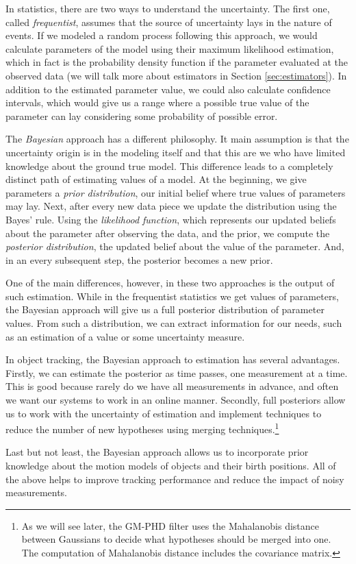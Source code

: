 
In statistics, there are two ways to understand the uncertainty. The first one,
called \textit{frequentist}, assumes that the source of uncertainty lays in the
nature of events. If we modeled a random process following this approach, we 
would calculate parameters of the model using their maximum likelihood 
estimation, which in fact is the probability density function if the parameter 
evaluated at the observed data (we will talk more about estimators in Section 
\ref{sec:estimators}). In addition to the estimated parameter 
value, we could also calculate confidence intervals, which would give us a 
range where a possible true value of the parameter can lay considering some 
probability of possible error.

The \textit{Bayesian} approach has a different philosophy. It main
assumption is that the uncertainty origin is in the modeling itself and that
this are we who have limited knowledge about the ground true model. This
difference leads to a completely distinct path of estimating values of a model.
At the beginning, we give parameters a \textit{prior distribution}, our
initial belief where true values of parameters may lay. Next, after every new
data piece we update the distribution using the Bayes' rule. Using the
\textit{likelihood function}, which represents our updated beliefs about the
parameter after observing the data, and the prior, we compute the
\textit{posterior distribution}, the updated belief about the value of the
parameter. And, in an every subsequent step, the posterior becomes a new prior.

One of the main differences, however, in these two approaches is the output of 
such estimation. While in the frequentist statistics we get values of 
parameters, the Bayesian approach will give us a full posterior distribution of 
parameter values. From such a distribution, we can extract information for our 
needs, such as an estimation of a value or some uncertainty measure.

In object tracking, the Bayesian approach to estimation has several advantages. 
Firstly, we can estimate the posterior as time passes, one measurement at a 
time. This is good because rarely do we have all measurements in advance, and 
often we want our systems to work in an online manner. Secondly, full 
posteriors allow us to work with the uncertainty of estimation and implement 
techniques to reduce the number of new hypotheses using merging 
techniques.\footnote{
    As we will see later, the GM-PHD filter uses the Mahalanobis distance 
    between Gaussians to decide what hypotheses should be merged into one. The 
    computation of Mahalanobis distance includes the covariance matrix.
}

Last but not least, the Bayesian approach allows us to incorporate prior 
knowledge about the motion models of objects and their birth positions. All of 
the above helps to improve tracking performance and reduce the impact of noisy 
measurements.
